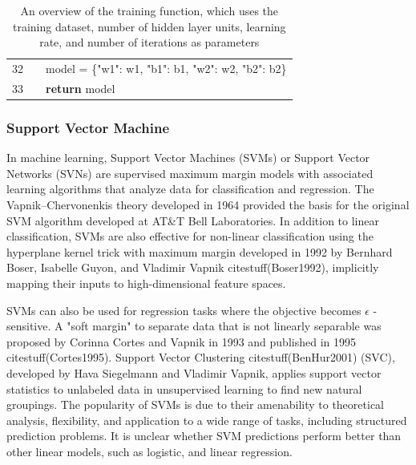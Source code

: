 \documentclass[preprint,12pt]{elsarticle}
\begin{document}
\begin{table}[ht]
{\begin{tabular}{|r l l l l|}
            \rowcolor{regularback} \cellcolor{linenumberback} \textcolor{grayhighlight}{32} & & \multicolumn{3}{l|}{model \textcolor{grayhighlight}{=} \{\textcolor{codered}{"w1"}: w1, \textcolor{codered}{"b1"}: b1, \textcolor{codered}{"w2"}: w2, \textcolor{codered}{"b2"}: b2\}} \\
            \rowcolor{regularback} \cellcolor{linenumberback} \textcolor{grayhighlight}{33} & & \multicolumn{3}{l|}{\textcolor{codegreen}{\textbf{return}} model} \\
            \hline
        \end{tabular}
    }
    \caption{An overview of the training function, which uses the training dataset, number of hidden layer units, learning rate, and number of iterations as parameters}
    \label{tab:train}
\end{table}

\subsubsection{Support Vector Machine}

In machine learning, Support Vector Machines (SVMs) or Support Vector Networks (SVNs) are supervised maximum margin models with associated learning algorithms that analyze data for classification and regression. The Vapnik–Chervonenkis theory developed in 1964 provided the basis for the original SVM algorithm developed at AT\&T Bell Laboratories. In addition to linear classification, SVMs are also effective for non-linear classification using the hyperplane kernel trick with maximum margin developed in 1992 by Bernhard Boser, Isabelle Guyon, and Vladimir Vapnik citestuff(Boser1992), implicitly mapping their inputs to high-dimensional feature spaces. 

SVMs can also be used for regression tasks where the objective becomes $\epsilon$ -sensitive. A "soft margin" to separate data that is not linearly separable was proposed by Corinna Cortes and Vapnik in 1993 and published in 1995 citestuff(Cortes1995). Support Vector Clustering citestuff(BenHur2001) (SVC), developed by Hava Siegelmann and Vladimir Vapnik, applies support vector statistics to unlabeled data in unsupervised learning to find new natural groupings. The popularity of SVMs is due to their amenability to theoretical analysis, flexibility, and application to a wide range of tasks, including structured prediction problems. It is unclear whether SVM predictions perform better than other linear models, such as logistic, and linear regression.
\end{document}
